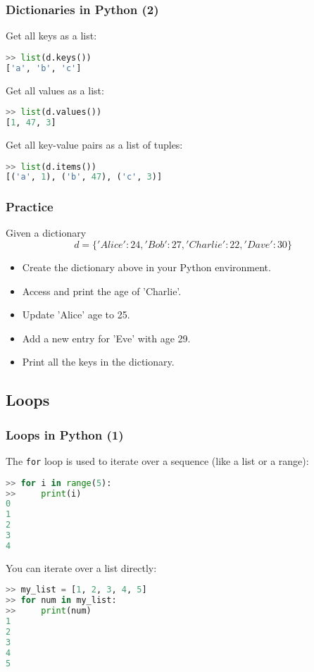 \begin{frame}[fragile]
  \frametitle{Dictionaries in Python (2)}
  Get all keys as a list:
  \begin{lstlisting}[language=Python,numbers=none]
>> list(d.keys())
['a', 'b', 'c']
  \end{lstlisting}\pause
  Get all values as a list:
  \begin{lstlisting}[language=Python,numbers=none]
>> list(d.values())
[1, 47, 3]
  \end{lstlisting}\pause
  Get all key-value pairs as a list of tuples:
  \begin{lstlisting}[language=Python,numbers=none]
>> list(d.items())
[('a', 1), ('b', 47), ('c', 3)]
  \end{lstlisting}
\end{frame}

\begin{frame}[fragile]
  \frametitle{Practice}
  Given a dictionary
  \[
  d = \{ 'Alice': 24, 'Bob': 27, 'Charlie': 22, 'Dave': 30 \}
  \]
  \begin{itemize}
   \item Create the dictionary above in your Python environment.\pause
   \item Access and print the age of 'Charlie'.\pause
   \item Update 'Alice' age to 25.\pause
   \item Add a new entry for 'Eve' with age 29.\pause
   \item Print all the keys in the dictionary.
  \end{itemize}
 \end{frame}

\subsection*{Loops}
\begin{frame}[fragile]
  \frametitle{Loops in Python (1)}
  The \lstinline$for$ loop is used to iterate over a sequence (like a list or a range):
  \begin{lstlisting}[language=Python,numbers=none]
>> for i in range(5):
>>     print(i)
0
1
2
3
4
  \end{lstlisting}\pause
  You can iterate over a list directly:
  \begin{lstlisting}[language=Python,numbers=none]
>> my_list = [1, 2, 3, 4, 5]
>> for num in my_list:
>>     print(num)
1
2
3
4
5
  \end{lstlisting}
\end{frame}

